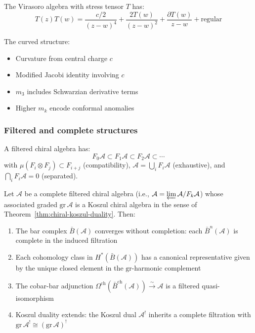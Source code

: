 \begin{example}
The Virasoro algebra with stress tensor $T$ has:
\[T(z)T(w) = \frac{c/2}{(z-w)^4} + \frac{2T(w)}{(z-w)^2} + \frac{\partial T(w)}{z-w} + \text{regular}\]

The curved structure:
\begin{itemize}
\item Curvature from central charge $c$
\item Modified Jacobi identity involving $c$
\item $m_3$ includes Schwarzian derivative terms
\item Higher $m_k$ encode conformal anomalies
\end{itemize}
\end{example}

\subsubsection{Filtered and complete structures}

\begin{definition}\label{def:filtered-chiral-algebra}
A filtered chiral algebra has:
\[F_0\mathcal{A} \subset F_1\mathcal{A} \subset F_2\mathcal{A} \subset \cdots\]
with $\mu(F_i \otimes F_j) \subset F_{i+j}$ (compatibility), $\mathcal{A} = \bigcup_i F_i\mathcal{A}$ (exhaustive), and $\bigcap_i F_i\mathcal{A} = 0$ (separated).
\end{definition}

\begin{theorem}
\label{thm:convergence-filtered}
Let $\mathcal{A}$ be a complete filtered chiral algebra (i.e.,
$\mathcal{A} = \varprojlim \mathcal{A}/F_k\mathcal{A}$) whose associated
graded $\mathrm{gr}\,\mathcal{A}$ is a Koszul chiral algebra in the sense of
Theorem~\ref{thm:chiral-koszul-duality}.  Then:
\begin{enumerate}
\item The bar complex $\bar{B}(\mathcal{A})$ converges without completion:
each $\bar{B}^n(\mathcal{A})$ is complete in the induced filtration
\item Each cohomology class in $H^*(\bar{B}(\mathcal{A}))$ has a canonical
representative given by the unique closed element in the $\mathrm{gr}$-harmonic
complement
\item The cobar-bar adjunction
$\Omega^{\mathrm{ch}}(\bar{B}^{\mathrm{ch}}(\mathcal{A})) \xrightarrow{\sim}
\mathcal{A}$ is a filtered quasi-isomorphism
\item Koszul duality extends: the Koszul dual $\mathcal{A}^!$ inherits a
complete filtration with $\mathrm{gr}\,\mathcal{A}^! \cong
(\mathrm{gr}\,\mathcal{A})^!$
\end{enumerate}
\end{theorem}

